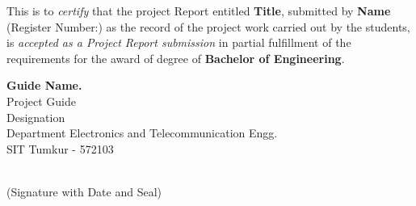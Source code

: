 \certificate

\vspace*{0.5in}

\noindent This is to \textit{certify} that the project Report entitled \textbf{Title}, submitted by \textbf{Name} (Register Number:) as the record of the project work carried out by the students, is \textit{accepted as a Project Report submission} in partial fulfillment of the requirements for the award of degree of \textbf{Bachelor of Engineering}.

\vspace*{2cm}

\begin{singlespacing}
\begin{flushright}
{\bf Guide Name.} \\
\noindent Project Guide \\ 
\noindent Designation \\
\noindent Department  Electronics and Telecommunication Engg.\\
\noindent SIT Tumkur - 572103 \\

\vspace*{2cm}

 \\
\noindent (Signature with Date and Seal)\\ 
\end{flushright}
\end{singlespacing} 
